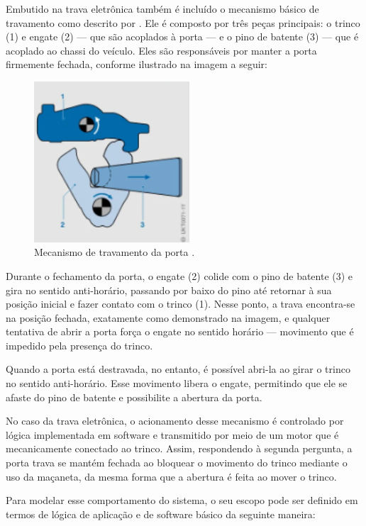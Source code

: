 Embutido na trava eletrônica também é incluído o mecanismo básico de travamento como descrito por \cite{reif2017locking}. Ele é composto por três peças principais: 
o trinco (1) e engate (2) — que são acoplados à porta — e  o pino de batente (3) — que é acoplado ao chassi do veículo. Eles são responsáveis por manter a porta 
firmemente fechada, conforme ilustrado na imagem a seguir:

\begin{figure}[H]
\centering
\includegraphics[height=6cm]{figuras/trava_mecanismo.png}
\caption{Mecanismo de travamento da porta \cite{reif2017locking}.}
\end{figure}

Durante o fechamento da porta, o engate (2) colide com o pino de batente (3) e gira no sentido anti-horário, passando por baixo do pino até retornar à sua posição 
inicial e fazer contato com o trinco (1). Nesse ponto, a trava encontra-se na posição fechada, exatamente como demonstrado na imagem, e qualquer tentativa de abrir 
a porta força o engate no sentido horário — movimento que é impedido pela presença do trinco.

Quando a porta está destravada, no entanto, é possível abri-la ao girar o trinco no sentido anti-horário. Esse movimento libera o engate, permitindo que ele se 
afaste do pino de batente e possibilite a abertura da porta.

No caso da trava eletrônica, o acionamento desse mecanismo é controlado por lógica implementada em software e transmitido por meio de um motor que é mecanicamente 
conectado ao trinco. Assim, respondendo à segunda pergunta, a porta trava se mantém fechada ao bloquear o movimento do trinco mediante o uso da maçaneta, da mesma 
forma que a abertura é feita ao mover o trinco.

Para modelar esse comportamento do sistema, o seu escopo pode ser definido em termos de lógica de aplicação e de software básico da seguinte maneira:


